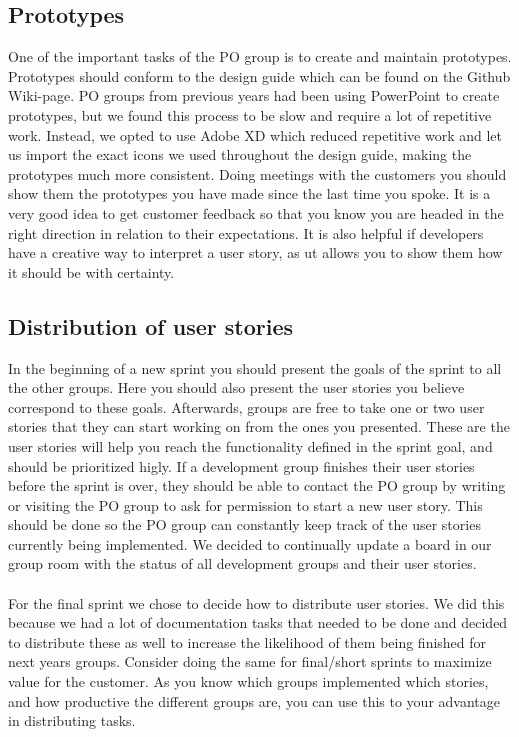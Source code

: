 \subsection{Prototypes}
One of the important tasks of the PO group is to create and maintain prototypes.
Prototypes should conform to the design guide which can be found on the Github Wiki-page.
PO groups from previous years had been using PowerPoint to create prototypes, but we found this process to be slow and require a lot of repetitive work.
Instead, we opted to use Adobe XD which reduced repetitive work and let us import the exact icons we used throughout the design guide, making the prototypes much more consistent.
Doing meetings with the customers you should show them the prototypes you have made since the last time you spoke.
It is a very good idea to get customer feedback so that you know you are headed in the right direction in relation to their expectations.
It is also helpful if developers have a creative way to interpret a user story, as ut allows you to show them how it should be with certainty.

\subsection{Distribution of user stories}
In the beginning of a new sprint you should present the goals of the sprint to all the other groups.
Here you should also present the user stories you believe correspond to these goals.
Afterwards, groups are free to take one or two user stories that they can start working on from the ones you presented.
These are the user stories will help you reach the functionality defined in the sprint goal, and should be prioritized higly.
If a development group finishes their user stories before the sprint is over, they should be able to contact the PO group by writing or visiting the PO group to ask for permission to start a new user story.
This should be done so the PO group can constantly keep track of the user stories currently being implemented.
We decided to continually update a board in our group room with the status of all development groups and their user stories.
\\\\
For the final sprint we chose to decide how to distribute user stories.
We did this because we had a lot of documentation tasks that needed to be done and decided to distribute these as well to increase the likelihood of them being finished for next years groups.
Consider doing the same for final/short sprints to maximize value for the customer.
As you know which groups implemented which stories, and how productive the different groups are, you can use this to your advantage in distributing tasks.


